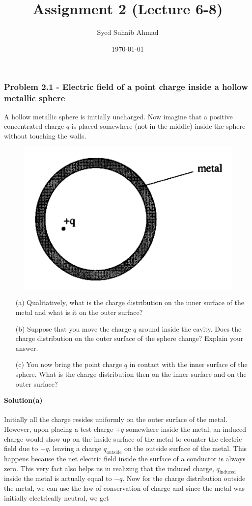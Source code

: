 \documentclass{article}
\title{Assignment \textbf{2} (Lecture 6-8)
}
\author{Syed Suhaib Ahmad}
\date{\today}
\begin{document}
\maketitle


\subsubsection*{Problem 2.1 - Electric field of a point charge inside a hollow metallic sphere}
A hollow metallic sphere is initially uncharged. Now imagine that a positive concentrated charge $q$ is placed somewhere (not in the middle) inside the sphere without touching the walls.
\begin{figure}[h]
        \centering
        \includegraphics[width=0.35\linewidth]{figs/fig_prob_2.1.png}
    \end{figure}
\begin{enumerate}
    \item[(a)]Qualitatively, what is the charge distribution on the inner surface of the metal and what is it on the outer surface? 
    \item[(b)]Suppose that you move the charge $q$ around inside the cavity. Does the charge distribution on the outer surface of the sphere change? Explain your answer.
    \item[(c)]You now bring the point charge $q$ in contact with the inner surface of the sphere. What is the charge distribution then on the inner surface and on the outer surface?
\end{enumerate}
\textbf{Solution(a)}
\\
\\Initially all the charge resides uniformly on the outer surface of the metal. However, upon placing a test charge $+q$ somewhere inside the metal, an induced charge would show up on the inside surface of the metal to counter the electric field due to $+q$, leaving a charge $q_{\text{outside}}$ on the outside surface of the metal. This happens because the net electric field inside the surface of a conductor is always zero. This very fact also helps us in realizing that the induced charge, $q_{\text{induced}}$ inside the metal is actually equal to $-q$. Now for the charge distribution outside the metal, we can use the law of conservation of charge and since the metal was initially electrically neutral, we get
\end{document}
